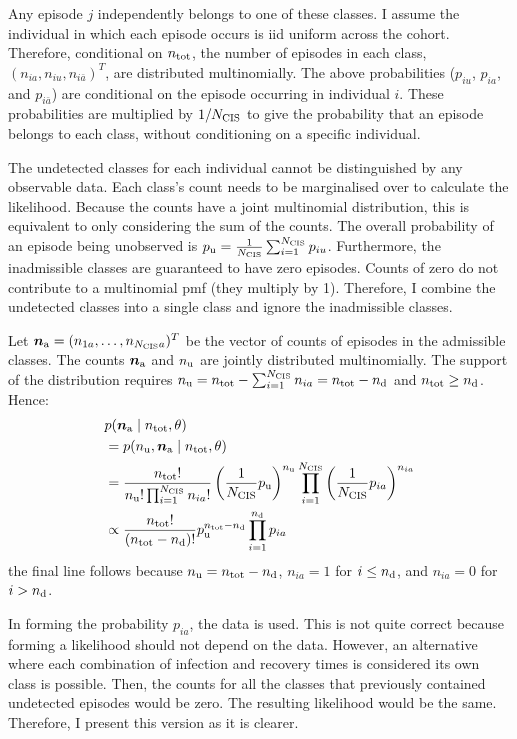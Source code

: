 \documentclass[thesis.tex]{subfiles}
\begin{document}
Any episode $j$ independently belongs to one of these classes.
I assume the individual in which each episode occurs is iid uniform across the cohort.
Therefore, conditional on $n_\text{tot}$, the number of episodes in each class, $(n_{ia}, n_{iu}, n_{i\bar{a}})^T$, are distributed multinomially.
The above probabilities ($p_{iu}$, $p_{ia}$, and $p_{i\bar{a}}$) are conditional on the episode occurring in individual $i$.
These probabilities are multiplied by $1/N_\text{CIS}$ to give the probability that an episode belongs to each class, without conditioning on a specific individual.

The undetected classes for each individual cannot be distinguished by any observable data.
Each class's count needs to be marginalised over to calculate the likelihood.
Because the counts have a joint multinomial distribution, this is equivalent to only considering the sum of the counts.
The overall probability of an episode being unobserved is $p_\text{u} = \frac{1}{N_\text{CIS}} \sum_{i=1}^{N_\text{CIS}} p_{iu}$.
Furthermore, the inadmissible classes are guaranteed to have zero episodes.
Counts of zero do not contribute to a multinomial pmf (they multiply by 1).
Therefore, I combine the undetected classes into a single class and ignore the inadmissible classes.

Let $\bm{n_\text{a}} = (n_{1a}, \dots, n_{N_\text{CIS} a})^T$ be the vector of counts of episodes in the admissible classes.
The counts $\bm{n_\text{a}}$ and $n_\text{u}$ are jointly distributed multinomially.
The support of the distribution requires $n_\text{u} = n_\text{tot} - \sum_{i=1}^{N_\text{CIS}} n_{ia} = n_\text{tot} - n_\text{d}$ and $n_\text{tot} \geq n_\text{d}$.
Hence:
\begin{align}
&p(\bm{n_\text{a}} \mid n_\text{tot}, \theta) \\
&= p(n_\text{u}, \bm{n_\text{a}}\mid n_\text{tot}, \theta) \\
&= \frac{n_\text{tot}!}{n_\text{u}! \prod_{i=1}^{N_\text{CIS}} n_{ia}!}  \left(\frac{1}{N_\text{CIS}}p_\text{u}\right)^{n_\text{u}}\prod_{i=1}^{N_\text{CIS}} \left(\frac{1}{N_\text{CIS}}p_{ia}\right)^{n_{ia}} \\
&\propto \frac{n_\text{tot}!}{(n_\text{tot} - n_\text{d})!} p_\text{u}^{n_\text{tot} - n_\text{d}} \prod_{i=1}^{n_\text{d}} p_{ia} \label{perf-test:eq:augmented-likelihood}
\end{align}
the final line follows because $n_\text{u} = n_\text{tot} - n_\text{d}$, $n_{ia} = 1$ for $i \leq n_\text{d}$, and $n_{ia} = 0$ for $i > n_\text{d}$.

In forming the probability $p_{ia}$, the data is used.
This is not quite correct because forming a likelihood should not depend on the data.
However, an alternative where each combination of infection and recovery times is considered its own class is possible.
Then, the counts for all the classes that previously contained undetected episodes would be zero.
The resulting likelihood would be the same.
Therefore, I present this version as it is clearer.
\end{document}
